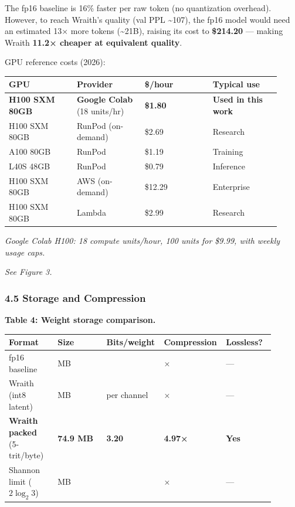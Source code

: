 The fp16 baseline is 16\% faster per raw token (no quantization
overhead). However, to reach Wraith's quality (val PPL
\textasciitilde107), the fp16 model would need an estimated 13× more
tokens (\textasciitilde21B), raising its cost to \textbf{\$214.20} ---
making Wraith \textbf{11.2× cheaper at equivalent quality}.

GPU reference costs (2026):

{\def\LTcaptype{none} %
{\footnotesize\setlength{\tabcolsep}{3pt}
\begin{longtable}[]{@{}>{\raggedright\arraybackslash}p{0.230\linewidth}>{\raggedright\arraybackslash}p{0.230\linewidth}>{\raggedright\arraybackslash}p{0.230\linewidth}>{\raggedright\arraybackslash}p{0.230\linewidth}@{}}
\toprule\noalign{}
GPU & Provider & \$/hour & Typical use \\
\midrule\noalign{}
\endhead
\bottomrule\noalign{}
\endlastfoot
\textbf{H100 SXM 80GB} & \textbf{Google Colab} (18 units/hr) &
\textbf{\$1.80} & \textbf{Used in this work} \\
H100 SXM 80GB & RunPod (on-demand) & \$2.69 & Research \\
A100 80GB & RunPod & \$1.19 & Training \\
L40S 48GB & RunPod & \$0.79 & Inference \\
H100 SXM 80GB & AWS (on-demand) & \$12.29 & Enterprise \\
H100 SXM 80GB & Lambda & \$2.99 & Research \\
\end{longtable}
}
}

\emph{Google Colab H100: 18 compute units/hour, 100 units for \$9.99,
with weekly usage caps.}

\emph{See Figure 3.}

\subsubsection{4.5 Storage and
Compression}\label{storage-and-compression}

\textbf{Table 4: Weight storage comparison.}

{\def\LTcaptype{none} %
{\footnotesize\setlength{\tabcolsep}{3pt}
\begin{longtable}[]{@{}>{\raggedright\arraybackslash}p{0.180\linewidth}>{\raggedright\arraybackslash}p{0.180\linewidth}>{\raggedright\arraybackslash}p{0.180\linewidth}>{\raggedright\arraybackslash}p{0.180\linewidth}>{\raggedright\arraybackslash}p{0.180\linewidth}@{}}
\toprule\noalign{}
Format & Size & Bits/weight & Compression & Lossless? \\
\midrule\noalign{}
\endhead
\bottomrule\noalign{}
\endlastfoot
fp16 baseline & 372 MB & 16.0 & 1.0× & --- \\
Wraith (int8 latent) & 372 MB & 8.0 per channel & 1.0× & --- \\
\textbf{Wraith packed} (5-trit/byte) & \textbf{74.9 MB} & \textbf{3.20}
& \textbf{4.97×} & \textbf{Yes} \\
Shannon limit (\(2 \log_2 3\)) & 73.6 MB & 3.17 & 5.05× & --- \\
\end{longtable}
}
}


